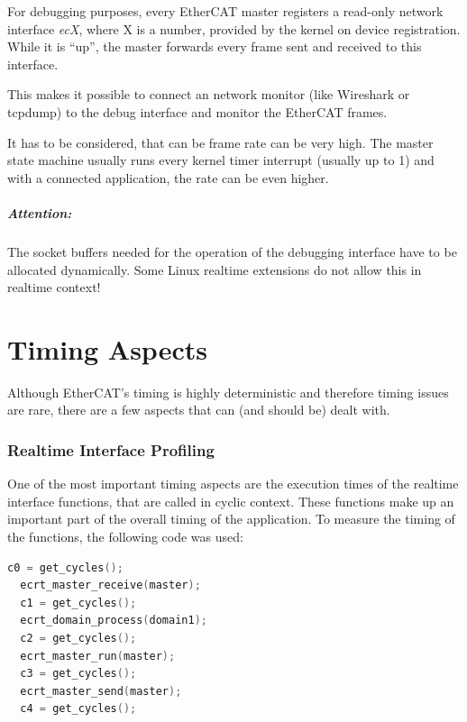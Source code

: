 \documentclass[a4paper,12pt,BCOR6mm,bibtotoc,idxtotoc]{scrbook}
\begin{document}
For debugging purposes, every EtherCAT master registers a read-only network
interface \textit{ecX}, where X is a number, provided by the kernel on device
registration. While it is ``up'', the master forwards every frame sent and
received to this interface.

This makes it possible to connect an network monitor (like Wireshark or
tcpdump) to the debug interface and monitor the EtherCAT frames.

It has to be considered, that can be frame rate can be very high. The master
state machine usually runs every kernel timer interrupt (usually up to
\unit{1}{\kilo\hertz}) and with a connected application, the rate can be even
higher.

\paragraph{Attention:} The socket buffers needed for the operation of
the debugging interface have to be allocated dynamically. Some Linux
realtime extensions do not allow this in realtime context!


\chapter{Timing Aspects}
\label{sec:timing}

Although EtherCAT's timing is highly deterministic and therefore timing issues
are rare, there are a few aspects that can (and should be) dealt with.


\subsection{Realtime Interface Profiling}
\label{sec:timing-profile}

One of the most important timing aspects are the execution times of the
realtime interface functions, that are called in cyclic context. These
functions make up an important part of the overall timing of the application.
To measure the timing of the functions, the following code was used:

\begin{lstlisting}[gobble=2,language=C]
  c0 = get_cycles();
  ecrt_master_receive(master);
  c1 = get_cycles();
  ecrt_domain_process(domain1);
  c2 = get_cycles();
  ecrt_master_run(master);
  c3 = get_cycles();
  ecrt_master_send(master);
  c4 = get_cycles();
\end{lstlisting}
\end{document}
